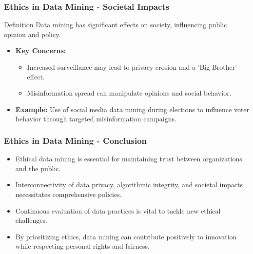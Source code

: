 \documentclass[aspectratio=169]{beamer}
\begin{document}
\begin{frame}[fragile]
    \frametitle{Ethics in Data Mining - Societal Impacts}
    \begin{block}{Definition}
        Data mining has significant effects on society, influencing public opinion and policy.
    \end{block}
    \begin{itemize}
        \item \textbf{Key Concerns:}
            \begin{itemize}
                \item Increased surveillance may lead to privacy erosion and a 'Big Brother' effect.
                \item Misinformation spread can manipulate opinions and social behavior.
            \end{itemize}
        \item \textbf{Example:} Use of social media data mining during elections to influence voter behavior through targeted misinformation campaigns.
    \end{itemize}
\end{frame}

\begin{frame}[fragile]
    \frametitle{Ethics in Data Mining - Conclusion}
    \begin{itemize}
        \item Ethical data mining is essential for maintaining trust between organizations and the public.
        \item Interconnectivity of data privacy, algorithmic integrity, and societal impacts necessitates comprehensive policies.
        \item Continuous evaluation of data practices is vital to tackle new ethical challenges.
        \item By prioritizing ethics, data mining can contribute positively to innovation while respecting personal rights and fairness.
    \end{itemize}
\end{frame}
\end{document}
